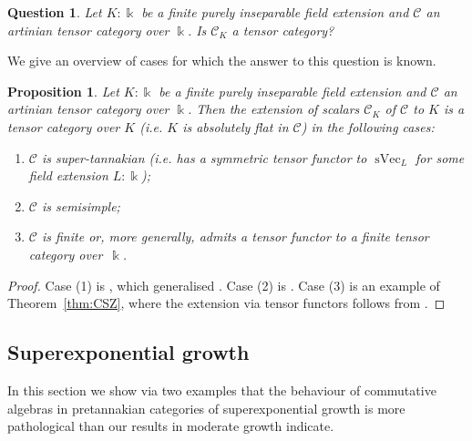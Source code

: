 \documentclass[11pt]{amsart}
\def\cC{\mathscr{C}}
\def\bk{\Bbbk}
\def\sVec{\operatorname{sVec}}
\newtheorem{prop}[thm]{Proposition}
\newtheorem{question}[thm]{Question}
\theoremstyle{definition}
\theoremstyle{remark}
\numberwithin{equation}{section}
\begin{document}
\begin{question}\label{q:fields}
    Let $K:\bk$ be a finite purely inseparable field extension and $\cC$ an artinian tensor category over $\bk$. Is $\cC_K$ a tensor category?
\end{question}



We give an overview of cases for which the answer to this question is known.

\begin{prop}\label{prop:exDel}
    Let $K:\bk$ be a finite purely inseparable field extension and $\cC$ an artinian tensor category over $\bk$. Then the extension of scalars $\cC_K$ of $\cC$ to $K$ is a tensor category over $K$ (i.e. $K$ is absolutely flat in $\cC$) in the following cases:
    \begin{enumerate}
        \item $\cC$ is super-tannakian (i.e. has a symmetric tensor functor to $\sVec_L$ for some field extension $L:\bk$);
        \item $\cC$ is semisimple;
        \item $\cC$ is finite or, more generally, admits a tensor functor to a finite tensor category over~$\Bbbk$.
    \end{enumerate}
\end{prop}

\begin{proof}
    Case (1) is \cite[Theorem~5.3.1]{CEOP}, which generalised \cite[Th\'eor\`eme~5.4]{Del14}. Case (2) is \cite[Theorem~5.4.1]{CEOP}. Case (3) is an example of Theorem~\ref{thm:CSZ}, where the extension via tensor functors follows from \cite[Lemma~5.2.5]{CEOP}.
\end{proof}



\subsection{Superexponential growth}

In this section we show via two examples that the behaviour of commutative algebras in pretannakian categories of superexponential growth is more pathological than our results in moderate growth indicate.
\end{document}
